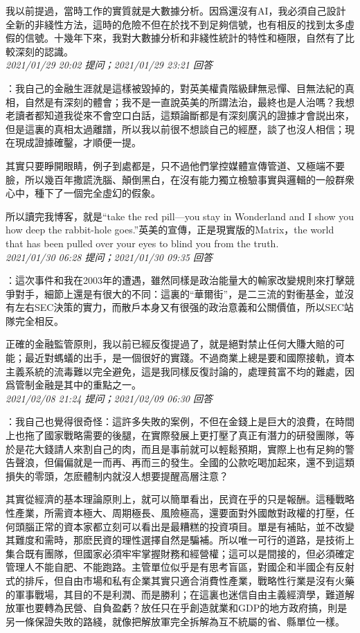 \documentclass[twocolumn]{ctexart}
\begin{document}
我以前提過，當時工作的實質就是大數據分析。因爲還沒有AI，我必須自己設計全新的非綫性方法，這時的危險不但在於找不到足夠信號，也有相反的找到太多虛假的信號。十幾年下來，我對大數據分析和非綫性統計的特性和極限，自然有了比較深刻的認識。
\\

\textit{\hfill\noindent\small 2021/01/29 20:02 提问；2021/01/29 23:21 回答}

：我自己的金融生涯就是這樣被毀掉的，對英美權貴階級肆無忌憚、目無法紀的真相，自然是有深刻的體會；我不是一直說英美的所謂法治，最終也是人治嗎？我想老讀者都知道我從來不會空口白話，這類論斷都是有深刻廣汎的證據才會説出來，但是這裏的真相太過離譜，所以我以前很不想談自己的經歷，談了也沒人相信；現在現成證據確鑿，才順便一提。

其實只要睜開眼睛，例子到處都是，只不過他們掌控媒體宣傳管道、又極端不要臉，所以幾百年撒謊洗腦、顛倒黑白，在沒有能力獨立檢驗事實與邏輯的一般群衆心中，種下了一個完全虛幻的假象。

所以讀完我博客，就是“take the red pill—you stay in Wonderland and I show you how deep the rabbit-hole goes.”英美的宣傳，正是現實版的Matrix，the world that has been pulled over your eyes to blind you from the truth.
\\

\textit{\hfill\noindent\small 2021/01/30 06:28 提问；2021/01/30 09:35 回答}

：這次事件和我在2003年的遭遇，雖然同樣是政治能量大的輸家改變規則來打擊競爭對手，細節上還是有很大的不同：這裏的“華爾街”，是二三流的對衝基金，並沒有左右SEC決策的實力，而散戶本身又有很强的政治意義和公關價值，所以SEC站隊完全相反。

正確的金融監管原則，我以前已經反復提過了，就是絕對禁止任何大賺大賠的可能；最近對螞蟻的出手，是一個很好的實踐。不過商業上總是要和國際接軌，資本主義系統的流毒難以完全避免，這是我同樣反復討論的，處理貧富不均的難處，因爲管制金融是其中的重點之一。
\\

\textit{\hfill\noindent\small 2021/02/08 21:24 提问；2021/02/09 06:30 回答}

：我自己也覺得很奇怪：這許多失敗的案例，不但在金錢上是巨大的浪費，在時間上也拖了國家戰略需要的後腿，在實際發展上更打壓了真正有潛力的研發團隊，等於是花大錢請人來割自己的肉，而且是事前就可以輕鬆預期，實際上也有足夠的警告聲浪，但偏偏就是一而再、再而三的發生。全國的公款吃喝加起來，還不到這類損失的零頭，怎麽體制内就沒人想要提醒高層注意？

其實從經濟的基本理論原則上，就可以簡單看出，民資在乎的只是報酬。這種戰略性產業，所需資本極大、周期極長、風險極高，還要面對外國敵對政權的打壓，任何頭腦正常的資本家都立刻可以看出是最糟糕的投資項目。單是有補貼，並不改變其難度和需時，那麽民資的理性選擇自然是騙補。所以唯一可行的道路，是技術上集合既有團隊，但國家必須牢牢掌握財務和經營權；這可以是間接的，但必須確定管理人不能自肥、不能跑路。主管單位似乎是有思考盲區，對國企和半國企有反射式的排斥，但自由市場和私有企業其實只適合消費性產業，戰略性行業是沒有火藥的軍事戰場，其目的不是利潤、而是勝利；在這裏也迷信自由主義經濟學，難道解放軍也要轉為民營、自負盈虧？放任只在乎創造就業和GDP的地方政府搞，則是另一條保證失敗的路綫，就像把解放軍完全拆解為互不統屬的省、縣單位一樣。
\end{document}
